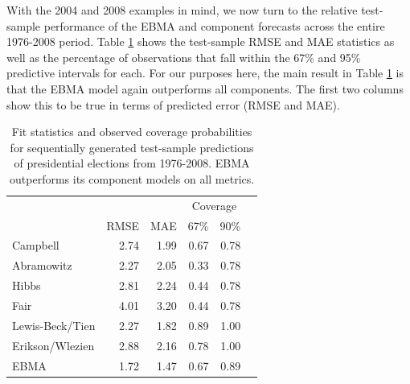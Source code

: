 With the 2004 and 2008 examples in mind, we now turn to the relative
test-sample performance of the EBMA and component forecasts across the
entire 1976-2008 period.  Table \ref{Pres-Res} shows the test-sample
RMSE and MAE statistics as well as the percentage of observations that
fall within the 67\% and 95\% predictive intervals for each.  For our
purposes here, the main result in Table \ref{Pres-Res} is that the
EBMA model again outperforms all components.  The first two columns
show this to be true in terms of predicted error (RMSE and
MAE).


\begin{table}[ht!]
  \caption{\footnotesize Fit statistics and observed coverage
    probabilities for sequentially generated test-sample predictions
    of presidential elections from 1976-2008.  EBMA outperforms its
    component models on all metrics.}
\label{Pres-Res} \small
\begin{center}
\begin{tabular}{lrrrrr}
\toprule
                        &              &              & \multicolumn{2}{c}{Coverage} \\ 
                    	&	RMSE&	MAE	&67\% &   90\%      \\
\midrule
Campbell	           &	2.74	&	1.99	&	0.67	&	0.78	\\
Abramowitz	   &	2.27	&	2.05	&	0.33	&     0.78	\\
Hibbs	           &	2.81	&	2.24	&	0.44&      0.78 \\
Fair	                   &	4.01	&	3.20	&	0.44	&	0.78	\\
Lewis-Beck/Tien&	2.27	&	1.82	&	0.89	&	1.00	\\
Erikson/Wlezien&	2.88	&	2.16	&	0.78	&	1.00	\\
EBMA	           &	1.72	&	1.47	&	0.67	&	0.89	\\
\bottomrule
\end{tabular}
\end{center}
\end{table}



